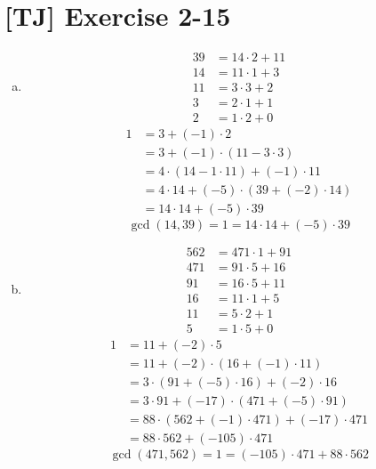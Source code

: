 \documentclass[a4paper,11pt,twocolumn]{article}
\begin{document}
  \section{[TJ] Exercise 2-15}
  \begin{enumerate}[(a)]
    \item
        \begin{align*}
          39 &= 14 \cdot 2 + 11 \\
          14 &= 11 \cdot 1 + 3 \\
          11 &= 3 \cdot 3 + 2 \\
          3 &= 2 \cdot 1 + 1 \\
          2 &= 1 \cdot 2 + 0
        \end{align*}
        \begin{align*}
          1 &= 3 + (-1) \cdot 2 \\
            &= 3 + (-1) \cdot (11 - 3 \cdot 3) \\
            &= 4 \cdot (14 - 1 \cdot 11) + (-1) \cdot 11 \\
            &= 4 \cdot 14 + (-5) \cdot (39 + (-2) \cdot 14) \\
            &= 14 \cdot 14 + (-5) \cdot 39
        \end{align*}
        $$ \gcd(14, 39) = 1 = 14 \cdot 14 + (-5) \cdot 39 $$
    \item
        \begin{align*}
          562 &= 471 \cdot 1 + 91 \\
          471 &= 91 \cdot 5 + 16 \\
          91 &= 16 \cdot 5 + 11 \\
          16 &= 11 \cdot 1 + 5 \\
          11 &= 5 \cdot 2 + 1 \\
          5 &= 1 \cdot 5 + 0
        \end{align*}
        \begin{align*}
          1 &= 11 + (-2) \cdot 5 \\
            &= 11 + (-2) \cdot (16 + (-1) \cdot 11) \\
            &= 3 \cdot (91 + (-5) \cdot 16) + (-2) \cdot 16 \\
            &= 3 \cdot 91 + (-17) \cdot (471 + (-5) \cdot 91) \\
            &= 88 \cdot (562 + (-1) \cdot 471) + (-17) \cdot 471\\
            &= 88 \cdot 562 + (-105) \cdot 471
        \end{align*}
        $$ \gcd(471, 562) = 1 = (-105) \cdot 471 + 88 \cdot 562 $$

\end{enumerate}
\end{document}
